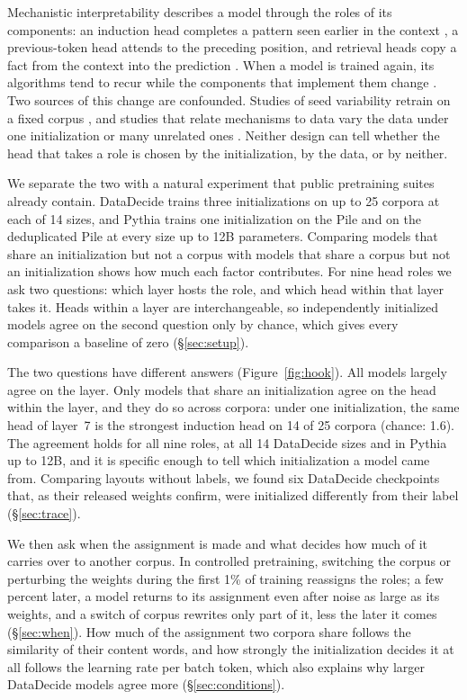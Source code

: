 \documentclass[11pt]{article}
\begin{document}
Mechanistic interpretability describes a model through the roles of its components: an induction head completes a pattern seen earlier in the context \citep{olsson2022context}, a previous-token head attends to the preceding position, and retrieval heads copy a fact from the context into the prediction \citep{wu2025retrieval}.
When a model is trained again, its algorithms tend to recur while the components that implement them change \citep{chughtai2023toy,gurnee2024universal,tigges2024llm,bali2026quantifying}.
Two sources of this change are confounded.
Studies of seed variability retrain on a fixed corpus \citep{sellam2022multiberts,vanderwal2025polypythias,bali2026quantifying}, and studies that relate mechanisms to data vary the data under one initialization or many unrelated ones \citep{chan2022data,singh2024needs,chen2026mechanistic}.
Neither design can tell whether the head that takes a role is chosen by the initialization, by the data, or by neither.

We separate the two with a natural experiment that public pretraining suites already contain.
DataDecide \citep{magnusson2025datadecide} trains three initializations on up to 25 corpora at each of 14 sizes, and Pythia \citep{biderman2023pythia} trains one initialization on the Pile and on the deduplicated Pile at every size up to 12B parameters.
Comparing models that share an initialization but not a corpus with models that share a corpus but not an initialization shows how much each factor contributes.
For nine head roles we ask two questions: which layer hosts the role, and which head within that layer takes it.
Heads within a layer are interchangeable, so independently initialized models agree on the second question only by chance, which gives every comparison a baseline of zero (\S\ref{sec:setup}).

The two questions have different answers (Figure~\ref{fig:hook}).
All models largely agree on the layer.
Only models that share an initialization agree on the head within the layer, and they do so across corpora: under one initialization, the same head of layer~7 is the strongest induction head on 14 of 25 corpora (chance: 1.6).
The agreement holds for all nine roles, at all 14 DataDecide sizes and in Pythia up to 12B, and it is specific enough to tell which initialization a model came from.
Comparing layouts without labels, we found six DataDecide checkpoints that, as their released weights confirm, were initialized differently from their label (\S\ref{sec:trace}).

We then ask when the assignment is made and what decides how much of it carries over to another corpus.
In controlled pretraining, switching the corpus or perturbing the weights during the first 1\% of training reassigns the roles; a few percent later, a model returns to its assignment even after noise as large as its weights, and a switch of corpus rewrites only part of it, less the later it comes (\S\ref{sec:when}).
How much of the assignment two corpora share follows the similarity of their content words, and how strongly the initialization decides it at all follows the learning rate per batch token, which also explains why larger DataDecide models agree more (\S\ref{sec:conditions}).
\end{document}

